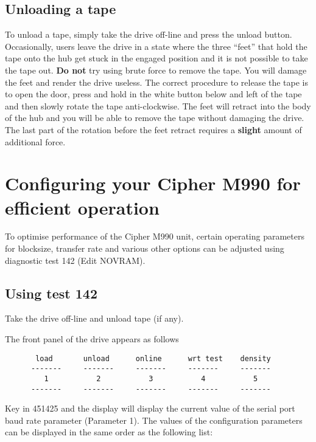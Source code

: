 \subsection{Unloading a tape}

To unload a tape, simply take the drive off-line and press the unload  button.
Occasionally, users leave the drive in a state where the three ``feet'' that hold
the tape onto the hub get stuck in the engaged position and it is not possible
to take the tape out. {\bf Do not} try using brute force to  remove the tape. You
will damage the feet and render the drive useless. The correct procedure to
release the tape is to open the door, press and hold in the white button below
and left of the tape and then slowly rotate the tape anti-clockwise. The feet will retract into
the body of the hub and you will be able to remove the tape without damaging
the drive. The last part of the rotation before the feet retract requires a 
{\bf slight} amount of additional force. 


\section{Configuring your Cipher M990 for efficient operation}

To optimise performance of the Cipher M990 unit, certain operating
parameters for blocksize, transfer rate and various other options can be
adjusted using diagnostic test 142 (Edit NOVRAM).

\subsection{Using test 142}

Take the drive off-line and unload tape (if any). 

The front panel of the drive appears as follows

\begin{verbatim}
       load       unload      online      wrt test    density
      -------     -------     -------     -------     -------
         1           2           3           4           5 
      -------     -------     -------     -------     -------
\end{verbatim}

Key in 451425 and the display will display the current value of the serial 
port baud rate parameter (Parameter 1). The values of the configuration
parameters can be displayed in the same order as the following list:

